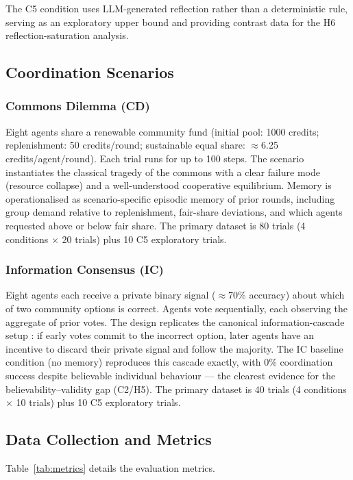 \documentclass[11pt]{article}
\begin{document}
The C5 condition uses LLM-generated reflection rather than a deterministic rule, serving as an exploratory upper bound and providing contrast data for the H6 reflection-saturation analysis.

\subsection{Coordination Scenarios}

\subsubsection{Commons Dilemma (CD)}
Eight agents share a renewable community fund (initial pool: 1000 credits; replenishment: 50 credits/round; sustainable equal share: $\approx$6.25 credits/agent/round). Each trial runs for up to 100 steps. The scenario instantiates the classical tragedy of the commons with a clear failure mode (resource collapse) and a well-understood cooperative equilibrium. Memory is operationalised as scenario-specific episodic memory of prior rounds, including group demand relative to replenishment, fair-share deviations, and which agents requested above or below fair share. The primary dataset is 80 trials (4 conditions $\times$ 20 trials) plus 10 C5 exploratory trials.

\subsubsection{Information Consensus (IC)}
Eight agents each receive a private binary signal ($\approx$70\% accuracy) about which of two community options is correct. Agents vote sequentially, each observing the aggregate of prior votes. The design replicates the canonical information-cascade setup \cite{bikhchandani1992theory}: if early votes commit to the incorrect option, later agents have an incentive to discard their private signal and follow the majority. The IC baseline condition (no memory) reproduces this cascade exactly, with 0\% coordination success despite believable individual behaviour --- the clearest evidence for the believability--validity gap (C2/H5). The primary dataset is 40 trials (4 conditions $\times$ 10 trials) plus 10 C5 exploratory trials.

\subsection{Data Collection and Metrics}
Table~\ref{tab:metrics} details the evaluation metrics.
\end{document}

